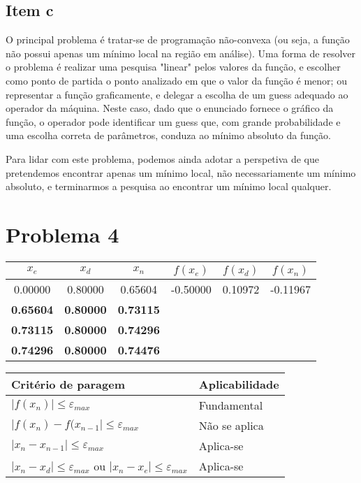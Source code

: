 {\subsection{Item c}
O principal problema é tratar-se de programação não-convexa (ou seja, a função não possui apenas um mínimo local na região em análise). Uma forma de resolver o problema é realizar uma pesquisa "linear" pelos valores da função, e escolher como ponto de partida o ponto analizado em que o valor da função é menor; ou representar a função graficamente, e delegar a escolha de um guess adequado ao operador da máquina. Neste caso, dado que o enunciado fornece o gráfico da função, o operador pode identificar um guess que, com grande probabilidade e uma escolha correta de parâmetros, conduza ao mínimo absoluto da função.\par
Para lidar com este problema, podemos ainda adotar a perspetiva de que pretendemos encontrar apenas um mínimo local, não necessariamente um mínimo absoluto, e terminarmos a pesquisa ao encontrar um mínimo local qualquer.

\newpage

\section{Problema 4}

\begin{center}
    \begin{tabular}{c | c | c | c | c | c}
        $x_e$ & $x_d$ & $x_n$ & $f(x_e)$ & $f(x_d)$ & $f(x_n)$ \\ \hline
        0.00000 & 0.80000 & 0.65604 & -0.50000 & 0.10972 & -0.11967 \\
        \textbf{0.65604} & \textbf{0.80000} & \textbf{0.73115} \\
        \textbf{0.73115} & \textbf{0.80000} & \textbf{0.74296} \\
        \textbf{0.74296} & \textbf{0.80000} & \textbf{0.74476} \\
    \end{tabular}
\end{center}
\begin{center}
    \begin{tabular}{l | l}
        Critério de paragem & Aplicabilidade \\ \hline
        $|f(x_n)          | \leq \varepsilon_{max}$ & Fundamental \\
        $|f(x_n)-f(x_{n-1}| \leq \varepsilon_{max}$ & Não se aplica \\
        $|x_n-x_{n-1}     | \leq \varepsilon_{max}$ & Aplica-se \\
        $|x_n-x_d| \leq \varepsilon_{max}$ ou $|x_n-x_e| \leq \varepsilon_{max}$ & Aplica-se
    \end{tabular}
\end{center}

}
